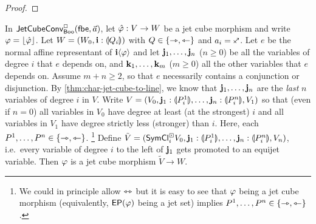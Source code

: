 \documentclass[a4paper]{memoir}
\begin{document}
\begin{proof}
%		
%		
\end{proof}
\begin{lemma} \label{thm:left-of-connection}
	In $\mathsf{JetCubeConv}^{\Box}_{\mathsf{Boo}}\mathopen{}\left( {\mathsf{fbe}},\vec a \right)\mathclose{}$, let $\hat {\varphi} : V \to W$ be a jet cube morphism and write $\varphi = \mathopen{}\left\lfloor \hat {\varphi} \right\rfloor\mathclose{}$.
	Let $W = (W_0, \mathbf{i} : {\llparenthesis Q_i \rrparenthesis})$ with $Q \in \mathopen{}\left\{ \rightarrowtriangle, \leftarrowtriangle \right\}\mathclose{}$ and $a_i = \ypolar$.
	Let $e$ be the normal affine representant of $\mathbf{i} \langle \varphi \rangle$ and let $\mathbf{j}_1, \ldots, \mathbf{j}_n$ ($n \geq 0$) be all the variables of degree $i$ that $e$ depends on, and $\mathbf{k}_1, \ldots, \mathbf{k}_m$ ($m \geq 0$) all the other variables that $e$ depends on.
	Assume $m+n \geq 2$, so that $e$ necessarily contains a conjunction or disjunction.
	By \cref{thm:char-jet-cube-to-line}, we know that $\mathbf{j}_1, \ldots, \mathbf{j}_n$ are the \emph{last} $n$ variables of degree $i$ in $V$.
	Write $V = (V_0, \mathbf{j}_1 : {\llparenthesis P^1_i \rrparenthesis}, \ldots, \mathbf{j}_n : {\llparenthesis P^n_i \rrparenthesis}, V_1)$ so that (even if $n = 0$) all variables in $V_0$ have degree at least (at the strongest) $i$ and all variables in $V_1$ have degree strictly less (stronger) than $i$.
	Here, each $P^1, \ldots, P^n \in \mathopen{}\left\{ \rightarrowtriangle, \leftarrowtriangle \right\}\mathclose{}$.%
	\footnote{We could in principle allow $\leftrightarrowtriangle$ but it is easy to see that $\varphi$ being a jet cube morphism (equivalently, $\mathsf{EP}(\varphi)$ being a jet set) implies $P^1, \ldots, P^n \in \mathopen{}\left\{ \rightarrowtriangle, \leftarrowtriangle \right\}\mathclose{}$.}
	Define $\tilde V = (\mathsf{SymCl}^\boxdot_i V_0, \mathbf{j}_1 : {\llparenthesis P^1_i \rrparenthesis}, \ldots, \mathbf{j}_n : {\llparenthesis P^n_i \rrparenthesis}, V_n)$, i.e.\ every variable of degree $i$ to the left of $\mathbf{j}_1$ gets promoted to an equijet variable.
	Then $\varphi$ is a jet cube morphism $\tilde V \to W$.
\end{lemma}
\end{document}
